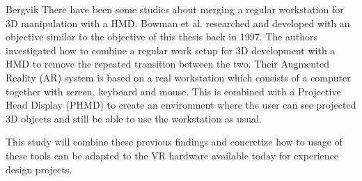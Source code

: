 Bergvik
There have been some studies about merging a regular workstation for 3D manipulation with a HMD\cite{UX:Alger2015}\cite{relatedwork:kijimaand1997transition}. Bowman et al. researched and developed with an objective similar to the objective of this thesis back in 1997\cite{relatedwork:kijimaand1997transition}. The authors investigated how to combine a regular work setup for 3D development with a HMD to remove the repeated transition between the two. Their Augmented Reality (AR) system is based on a real workstation which consists of a computer together with screen, keyboard and mouse. This is combined with a Projective Head Display (PHMD) to create an environment where the user can see projected 3D objects and still be able to use the workstation as usual.

This study will combine these previous findings and concretize how to usage of these tools can be adapted to the VR hardware available today for experience design projects.
